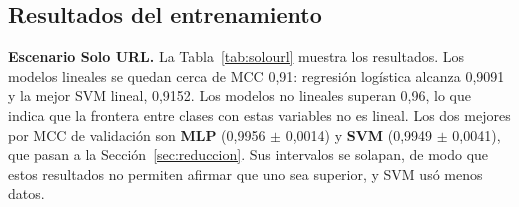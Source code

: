 \documentclass[journal]{IEEEtran}
\begin{document}
\subsection{Resultados del entrenamiento}

\textbf{Escenario Solo URL.} La Tabla~\ref{tab:solourl} muestra los resultados. Los modelos lineales
se quedan cerca de MCC 0,91: regresión logística alcanza 0,9091 y la mejor SVM lineal, 0,9152. Los
modelos no lineales superan 0,96, lo que indica que la frontera entre clases con estas variables
no es lineal. Los dos mejores por MCC de validación son \textbf{MLP} (0,9956 $\pm$ 0,0014) y
\textbf{SVM} (0,9949 $\pm$ 0,0041), que pasan a la Sección~\ref{sec:reduccion}. Sus intervalos se solapan, de
modo que estos resultados no permiten afirmar que uno sea superior, y SVM usó menos datos.

\begin{table}[t]
\centering
\caption{Resultados del escenario Solo URL (media $\pm$ 2 desviaciones estándar). Las columnas de
exactitud a FPR corresponden a validación. El entrenamiento de KNN no se evaluó por pliegue: con
$k=1$ vale 1 por construcción. Entrenamiento y validación de SVM usan el subconjunto de 31.383
muestras.}
\label{tab:solourl}
\end{table}
\end{document}
